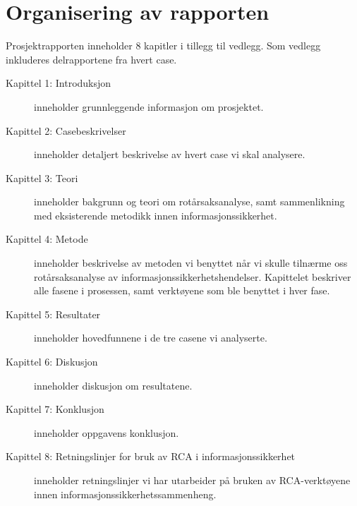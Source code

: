 \section{Organisering av rapporten}
\label{sec:organisering_rapport}
Prosjektrapporten inneholder 8 kapitler i tillegg til vedlegg. Som vedlegg inkluderes delrapportene fra hvert case. 


\begin{description}
    \item [Kapittel 1: Introduksjon] inneholder grunnleggende informasjon om prosjektet.
    \item [Kapittel 2: Casebeskrivelser] inneholder detaljert beskrivelse av hvert case vi skal analysere.
    \item [Kapittel 3: Teori] inneholder bakgrunn og teori om rotårsaksanalyse, samt sammenlikning med eksisterende metodikk innen informasjonssikkerhet.
    \item [Kapittel 4: Metode] inneholder beskrivelse av metoden vi benyttet når vi skulle tilnærme oss rotårsaksanalyse av informasjonssikkerhetshendelser. Kapittelet beskriver alle fasene i prosessen, samt verktøyene som ble benyttet i hver fase. 
    \item [Kapittel 5: Resultater] inneholder hovedfunnene i de tre casene vi analyserte.
    \item [Kapittel 6: Diskusjon] inneholder diskusjon om resultatene.
    \item [Kapittel 7: Konklusjon] inneholder oppgavens konklusjon.
    \item [Kapittel 8: Retningslinjer for bruk av RCA i informasjonssikkerhet] inneholder retningslinjer vi har utarbeider på bruken av RCA-verktøyene innen informasjonssikkerhetssammenheng. 
\end{description}